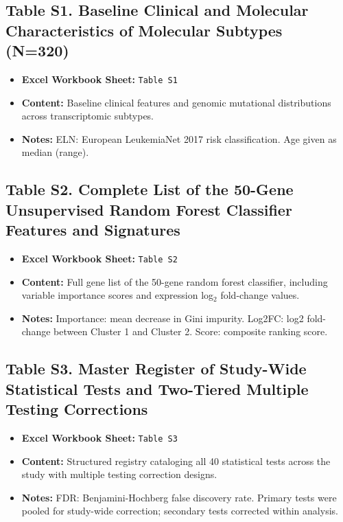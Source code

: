 \documentclass[11pt,a4paper]{article}
\begin{document}
\clearpage

\subsection*{Table S1. Baseline Clinical and Molecular Characteristics of Molecular Subtypes (N=320)}
\hypertarget{tab:tabS1}{}
\label{tab:tabS1}
\begin{itemize}
    \item \textbf{Excel Workbook Sheet:} \texttt{Table S1}
    \item \textbf{Content:} Baseline clinical features and genomic mutational distributions across transcriptomic subtypes.
    \item \textbf{Notes:} ELN: European LeukemiaNet 2017 risk classification. Age given as median (range).
\end{itemize}

\subsection*{Table S2. Complete List of the 50-Gene Unsupervised Random Forest Classifier Features and Signatures}
\hypertarget{tab:tabS2}{}
\label{tab:tabS2}
\begin{itemize}
    \item \textbf{Excel Workbook Sheet:} \texttt{Table S2}
    \item \textbf{Content:} Full gene list of the 50-gene random forest classifier, including variable importance scores and expression log$_2$ fold-change values.
    \item \textbf{Notes:} Importance: mean decrease in Gini impurity. Log2FC: log2 fold-change between Cluster 1 and Cluster 2. Score: composite ranking score.
\end{itemize}

\subsection*{Table S3. Master Register of Study-Wide Statistical Tests and Two-Tiered Multiple Testing Corrections}
\hypertarget{tab:tabS3}{}
\label{tab:tabS3}
\begin{itemize}
    \item \textbf{Excel Workbook Sheet:} \texttt{Table S3}
    \item \textbf{Content:} Structured registry cataloging all 40 statistical tests across the study with multiple testing correction designs.
    \item \textbf{Notes:} FDR: Benjamini-Hochberg false discovery rate. Primary tests were pooled for study-wide correction; secondary tests corrected within analysis.
\end{itemize}
\end{document}
